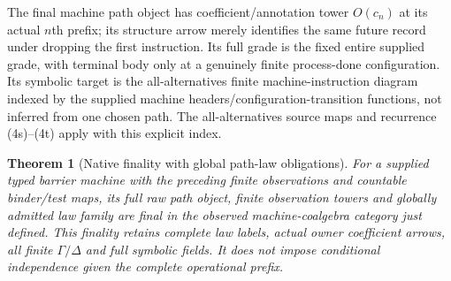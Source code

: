 \documentclass[11pt]{article}
\newtheorem{theorem}{Theorem}\newtheorem{proposition}{Proposition}
\begin{document}
The final machine path object has coefficient/annotation tower $O(c_n)$ at its actual $n$th prefix; its structure arrow merely identifies the same future record under dropping the first instruction. Its full grade is the fixed entire supplied grade, with terminal body only at a genuinely finite process-done configuration. Its symbolic target is the all-alternatives finite machine-instruction diagram indexed by the supplied machine headers/configuration-transition functions, not inferred from one chosen path. The all-alternatives source maps and recurrence (4s)--(4t) apply with this explicit index.

\begin{theorem}[Native finality with global path-law obligations]
For a supplied typed barrier machine with the preceding finite observations and countable binder/test maps, its full raw path object, finite observation towers and globally admitted law family are final in the observed machine-coalgebra category just defined. This finality retains complete law labels, actual owner coefficient arrows, all finite $\Gamma/\Delta$ and full symbolic fields. It does not impose conditional independence given the complete operational prefix.
\end{theorem}
\end{document}
